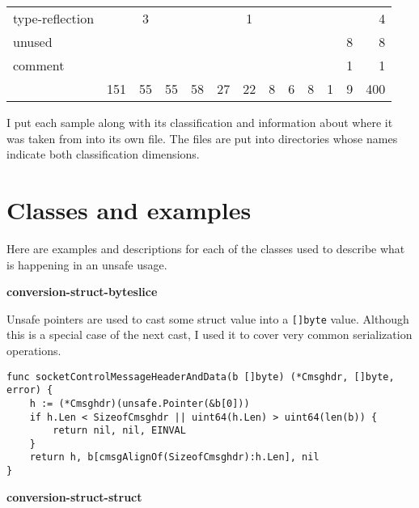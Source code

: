 \begin{table}[h]
\begin{tabularx}{\textwidth}{Xccccccccccc|r}
        \rowcolor{verylightgray}
                          type-reflection &       &   3 &     &      &     &   1 &    &     &    &    &    &    4 \\
                                   unused &       &     &     &      &     &     &    &     &    &    &  8 &    8 \\
        \rowcolor{verylightgray}
                                  comment &       &     &     &      &     &     &    &     &    &    &  1 &    1 \\ \hline
                                       {} &   151 &  55 &  55 &   58 &  27 &  22 &  8 &   6 &  8 &  1 &  9 &  400 \\
        \bottomrule
    \end{tabularx}
\end{table}

I put each sample along with its classification and information about where it was taken from into its own file.
The files are put into directories whose names indicate both classification dimensions.



\section{Classes and examples}\label{sec:survey-small-classes}

Here are examples and descriptions for each of the classes used to describe what is happening in an unsafe usage.

\textbf{conversion-struct-byteslice}

Unsafe pointers are used to cast some struct value into a \texttt{[]byte} value.
Although this is a special case of the next cast, I used it to cover very common serialization operations.

\begin{lstlisting}[language=Golang, label=lst:survey-small-classexample-conversion-struct-byteslice, caption=Usage class example: conversion-struct-byteslice]
func socketControlMessageHeaderAndData(b []byte) (*Cmsghdr, []byte, error) {
    h := (*Cmsghdr)(unsafe.Pointer(&b[0]))
    if h.Len < SizeofCmsghdr || uint64(h.Len) > uint64(len(b)) {
        return nil, nil, EINVAL
    }
    return h, b[cmsgAlignOf(SizeofCmsghdr):h.Len], nil
}
\end{lstlisting}


\textbf{conversion-struct-struct}

